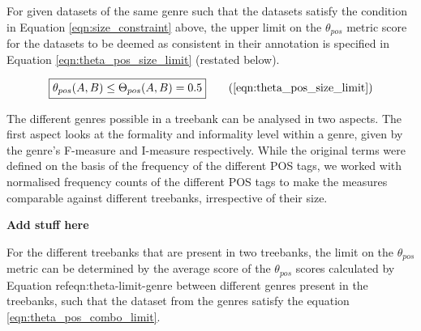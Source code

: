 For given datasets of the same genre such that the datasets satisfy the condition in Equation \ref{eqn:size_constraint} above, the upper limit on the $\theta_{pos}$ metric score for the datasets to be deemed as consistent in their annotation is specified in Equation \ref{eqn:theta_pos_size_limit} (restated below).

\begin{equation}
\boxed{\theta_{pos}(A,B) \leq \Theta_{pos}(A,B) = 0.5}  \tag{\ref{eqn:theta_pos_size_limit}}
\end{equation}

The different genres possible in a treebank can be analysed in two aspects. The first aspect looks at the formality and informality level within a genre, given by the genre's F-measure and I-measure respectively. While the original terms were defined on the basis of the frequency of the different POS tags, we worked with normalised frequency counts of the different POS tags to make the measures comparable against different treebanks, irrespective of their size. 

\textbf{Add stuff here}

For the different treebanks that are present in two treebanks, the limit on the $\theta_{pos}$ metric can be determined by the average score of the $\theta_{pos}$ scores calculated by Equation ref{eqn:theta-limit-genre} between different genres present in the treebanks, such that the dataset from the genres satisfy the equation \ref{eqn:theta_pos_combo_limit}.


